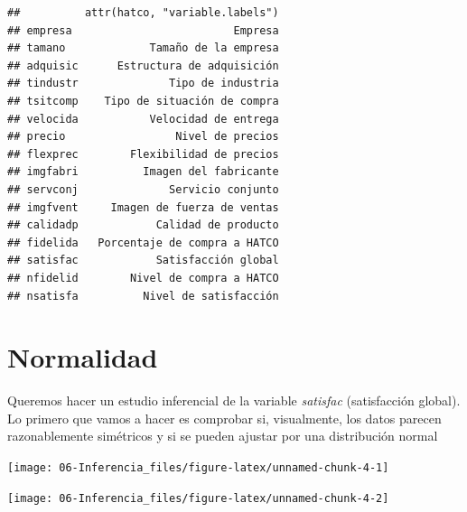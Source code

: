 \documentclass[]{book}
\newenvironment{Shaded}{\begin{snugshade}}{\end{snugshade}}
\newcommand{\KeywordTok}[1]{\textcolor[rgb]{0.13,0.29,0.53}{\textbf{#1}}}
\newcommand{\OperatorTok}[1]{\textcolor[rgb]{0.81,0.36,0.00}{\textbf{#1}}}
\newcommand{\NormalTok}[1]{#1}
\begin{document}
\begin{verbatim}
##          attr(hatco, "variable.labels")
## empresa                         Empresa
## tamano             Tamaño de la empresa
## adquisic      Estructura de adquisición
## tindustr              Tipo de industria
## tsitcomp    Tipo de situación de compra
## velocida           Velocidad de entrega
## precio                 Nivel de precios
## flexprec        Flexibilidad de precios
## imgfabri          Imagen del fabricante
## servconj              Servicio conjunto
## imgfvent     Imagen de fuerza de ventas
## calidadp            Calidad de producto
## fidelida   Porcentaje de compra a HATCO
## satisfac            Satisfacción global
## nfidelid        Nivel de compra a HATCO
## nsatisfa          Nivel de satisfacción
\end{verbatim}

\section{Normalidad}\label{normalidad}

Queremos hacer un estudio inferencial de la variable \emph{satisfac}
(satisfacción global). Lo primero que vamos a hacer es comprobar si,
visualmente, los datos parecen razonablemente simétricos y si se pueden
ajustar por una distribución normal

\begin{Shaded}
\end{Shaded}

\begin{center}\texttt{[image: 06-Inferencia\_files/figure-latex/unnamed-chunk-4-1]} \end{center}

\begin{Shaded}
\end{Shaded}

\begin{center}\texttt{[image: 06-Inferencia\_files/figure-latex/unnamed-chunk-4-2]} \end{center}

\begin{Shaded}
\end{Shaded}
\end{document}
